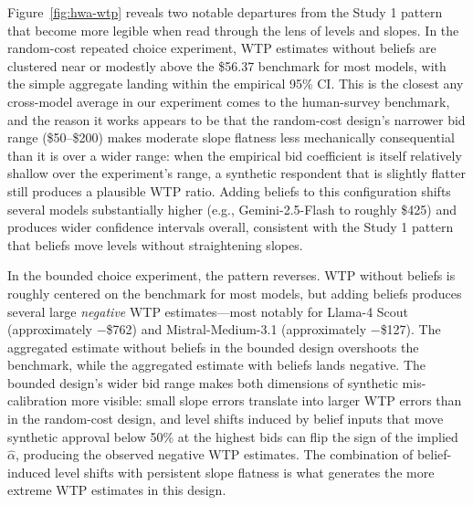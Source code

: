 \documentclass[12pt]{article}
\begin{document}
Figure~\ref{fig:hwa-wtp} reveals two notable departures from the Study
1 pattern that become more legible when read through the lens of levels and slopes. 
In the random-cost repeated choice experiment, WTP estimates without beliefs
are clustered near or modestly above the \$56.37 benchmark for most
models, with the simple aggregate landing within the empirical 95\% CI.
This is the closest any cross-model average in our experiment comes to
the human-survey benchmark, and the reason it works appears to be that
the random-cost design's narrower bid range (\$50--\$200) makes
moderate slope flatness less mechanically consequential than it is over
a wider range: when the empirical bid coefficient is itself relatively
shallow over the experiment's range, a synthetic respondent that is
slightly flatter still produces a plausible WTP ratio. Adding beliefs
to this configuration shifts several models substantially higher (e.g.,
Gemini-2.5-Flash to roughly \$425) and produces wider
confidence intervals overall, consistent with the Study 1 pattern that
beliefs move levels without straightening slopes.

In the bounded choice experiment, the pattern reverses. WTP without
beliefs is roughly centered on the benchmark for most models, but adding
beliefs produces several large \emph{negative} WTP estimates---most
notably for Llama-4 Scout (approximately $-$\$762) and
Mistral-Medium-3.1 (approximately $-$\$127). The aggregated
estimate without beliefs in the bounded design overshoots the benchmark,
while the aggregated estimate with beliefs lands negative. The bounded
design's wider bid range makes both dimensions of synthetic
mis-calibration more visible: small slope errors translate into larger
WTP errors than in the random-cost design, and level shifts induced by
belief inputs that move synthetic approval below 50\% at the highest
bids can flip the sign of the implied $\hat{\alpha}$, producing the
observed negative WTP estimates. The combination of belief-induced level
shifts with persistent slope flatness is what generates the more extreme
WTP estimates in this design.
\end{document}

